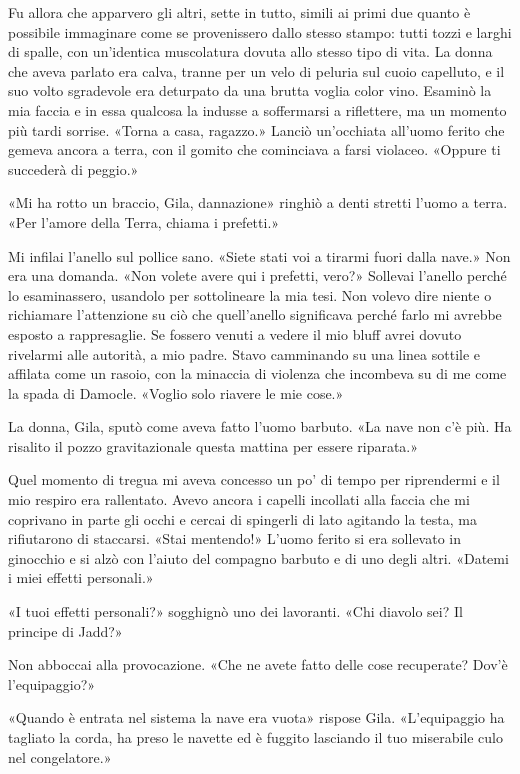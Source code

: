 Fu allora che apparvero gli altri, sette in tutto, simili ai primi due
quanto è possibile immaginare come se provenissero dallo stesso stampo:
tutti tozzi e larghi di spalle, con un'identica muscolatura dovuta allo
stesso tipo di vita. La donna che aveva parlato era calva, tranne per un
velo di peluria sul cuoio capelluto, e il suo volto sgradevole era
deturpato da una brutta voglia color vino. Esaminò la mia faccia e in
essa qualcosa la indusse a soffermarsi a riflettere, ma un momento più
tardi sorrise. «Torna a casa, ragazzo.» Lanciò un'occhiata all'uomo
ferito che gemeva ancora a terra, con il gomito che cominciava a farsi
violaceo. «Oppure ti succederà di peggio.»

«Mi ha rotto un braccio, Gila, dannazione» ringhiò a denti stretti
l'uomo a terra. «Per l'amore della Terra, chiama i prefetti.»

Mi infilai l'anello sul pollice sano. «Siete stati voi a tirarmi fuori
dalla nave.» Non era una domanda. «Non volete avere qui i prefetti,
vero?» Sollevai l'anello perché lo esaminassero, usandolo per
sottolineare la mia tesi. Non volevo dire niente o richiamare
l'attenzione su ciò che quell'anello significava perché farlo mi avrebbe
esposto a rappresaglie. Se fossero venuti a vedere il mio bluff avrei
dovuto rivelarmi alle autorità, a mio padre. Stavo camminando su una
linea sottile e affilata come un rasoio, con la minaccia di violenza che
incombeva su di me come la spada di Damocle. «Voglio solo riavere le mie
cose.»

La donna, Gila, sputò come aveva fatto l'uomo barbuto. «La nave non c'è
più. Ha risalito il pozzo gravitazionale questa mattina per essere
riparata.»

Quel momento di tregua mi aveva concesso un po' di tempo per riprendermi
e il mio respiro era rallentato. Avevo ancora i capelli incollati alla
faccia che mi coprivano in parte gli occhi e cercai di spingerli di lato
agitando la testa, ma rifiutarono di staccarsi. «Stai mentendo!» L'uomo
ferito si era sollevato in ginocchio e si alzò con l'aiuto del compagno
barbuto e di uno degli altri. «Datemi i miei effetti personali.»

«I tuoi effetti personali?» sogghignò uno dei lavoranti. «Chi diavolo
sei? Il principe di Jadd?»

Non abboccai alla provocazione. «Che ne avete fatto delle cose
recuperate? Dov'è l'equipaggio?»

«Quando è entrata nel sistema la nave era vuota» rispose Gila.
«L'equipaggio ha tagliato la corda, ha preso le navette ed è fuggito
lasciando il tuo miserabile culo nel congelatore.»

